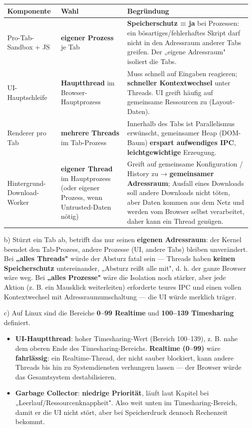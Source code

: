 \documentclass[11pt, a4paper]{article}
\begin{document}
{\small
\begin{tabularx}{\linewidth}{XXX}
\hline
\rowcolor{tableheadbg}
{\color{white}\textbf{Komponente}} & {\color{white}\textbf{Wahl}} & {\color{white}\textbf{Begründung}} \\[2pt]
\hline
\endhead
\hline
\endfoot
Pro-Tab-Sandbox + JS & \textbf{eigener Prozess} je Tab & \textbf{Speicherschutz = ja} bei Prozessen: ein bösartiges/fehlerhaftes Skript darf nicht in den Adressraum anderer Tabs greifen. Der „eigene Adressraum" isoliert die Tabs. \\
UI-Hauptschleife & \textbf{Hauptthread} im Browser-Hauptprozess & Muss schnell auf Eingaben reagieren; \textbf{schneller Kontextwechsel} unter Threads. UI greift häufig auf gemeinsame Ressourcen zu (Layout-Daten). \\
Renderer pro Tab & \textbf{mehrere Threads} im Tab-Prozess & Innerhalb des Tabs ist Parallelismus erwünscht, gemeinsamer Heap (DOM-Baum) \textbf{erspart aufwendiges IPC}, \textbf{leichtgewichtige} Erzeugung. \\
Hintergrund-Download-Worker & \textbf{eigener Thread} im Hauptprozess (oder eigener Prozess, wenn Untrusted-Daten nötig) & Greift auf gemeinsame Konfiguration / History zu → \textbf{gemeinsamer Adressraum}; Ausfall eines Downloads soll andere Downloads nicht töten, aber Daten kommen aus dem Netz und werden vom Browser selbst verarbeitet, daher kann ein Thread genügen. \\
\end{tabularx}
}


b) Stürzt ein Tab ab, betrifft das nur seinen \textbf{eigenen Adressraum}: der Kernel beendet den Tab-Prozess, andere Prozesse (UI, andere Tabs) bleiben unverändert. Bei \textbf{„alles Threads"} würde der Absturz fatal sein — Threads haben \textbf{keinen Speicherschutz} untereinander, „Absturz reißt alle mit", d. h. der ganze Browser wäre weg. Bei \textbf{„alles Prozesse"} wäre die Isolation noch stärker, aber jede Aktion (z. B. ein Mausklick weiterleiten) erforderte teures IPC und einen vollen Kontextwechsel mit Adressraumumschaltung — die UI würde merklich träger.


c) Auf Linux sind die Bereiche \textbf{0–99 Realtime} und \textbf{100–139 Timesharing} definiert.

\begin{itemize}
  \item \textbf{UI-Hauptthread}: hoher Timesharing-Wert (Bereich 100–139), z. B. nahe dem oberen Ende des Timesharing-Bereichs. \textbf{Realtime (0–99)} wäre \textbf{fahrlässig}: ein Realtime-Thread, der nicht sauber blockiert, kann andere Threads bis hin zu Systemdiensten verhungern lassen — der Browser würde das Gesamtsystem destabilisieren.
  \item \textbf{Garbage Collector}: \textbf{niedrige Priorität}, läuft laut Kapitel bei „Leerlauf/Ressourcenknappheit". Also weit unten im Timesharing-Bereich, damit er die UI nicht stört, aber bei Speicherdruck dennoch Rechenzeit bekommt.
\end{itemize}
\end{document}

